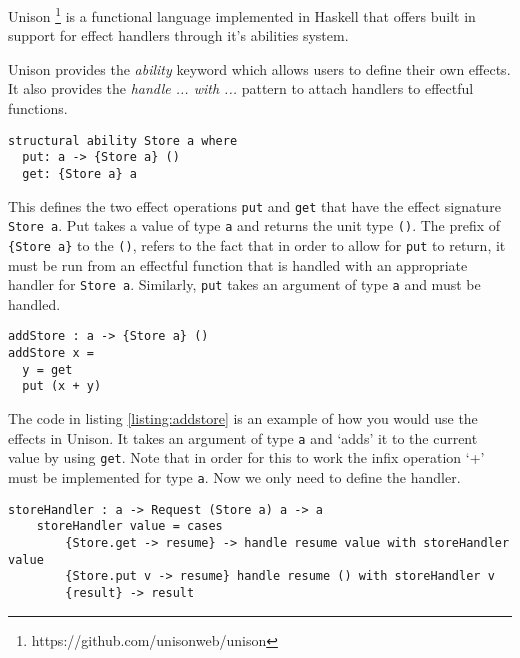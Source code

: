 \documentclass[logo,bsc,singlespacing,parskip]{infthesis}
\begin{document}
Unison \footnote{https://github.com/unisonweb/unison} is a
functional language implemented in Haskell that offers built in support for effect
handlers through it's abilities system.

Unison provides the \emph{ability} keyword which allows users to define their own
effects. It also provides the \emph{handle ... with ...} pattern to attach handlers to effectful functions.

\begin{lstlisting}[caption={The \emph{put} and \emph{store} example in Unison. Note that the \emph{structural} keyword refers to the fact that Unison stores type definitions as a hash. Even if we changed all the variable names it would still view it as the same type. To avoid that behaviour you can swap the \emph{structural} keyword for \emph{unique}}]
structural ability Store a where
  put: a -> {Store a} ()
  get: {Store a} a
\end{lstlisting}

This defines the two effect operations \texttt{put} and \texttt{get} that have
the effect signature \texttt{Store a}. Put takes a value of type \texttt{a} and
returns the unit type \texttt{()}. The prefix of \texttt{\{Store a\}} to the
\texttt{()}, refers to the fact that in order to allow for \texttt{put} to
return, it must be run from an effectful function that is handled with an
appropriate handler for \texttt{Store a}. Similarly, \texttt{put} takes an
argument of type \texttt{a} and must be handled.

\begin{lstlisting}[language=unison, caption={An example of an effectful function that uses the \texttt{Store} effect}]
addStore : a -> {Store a} ()
addStore x =
  y = get
  put (x + y)
\end{lstlisting}
\label{listing:addstore}

The code in listing \ref{listing:addstore} is an example of how you would use
the effects in Unison. It takes an argument of type \texttt{a} and `adds' it to
the current value by using \texttt{get}. Note that in order for this to work the
infix operation `+' must be implemented for type \texttt{a}. Now we only need to
define the handler.

\begin{lstlisting}[caption={The handler for the \texttt{Store} effect}]
    storeHandler : a -> Request (Store a) a -> a
    storeHandler value = cases
        {Store.get -> resume} -> handle resume value with storeHandler value
        {Store.put v -> resume} handle resume () with storeHandler v
        {result} -> result

\end{lstlisting}
\end{document}
